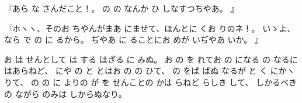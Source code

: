『あら
な
さんだこと！。
の
の
なんか
ひ
しなすつちやあ。
』

『ホヽヽ、そのお
ちやんがまあ
にませて、ほんとに
くお
りのネ！。
いゝよ、
なら
で
の
に
るから。
ぢやあ
に
ることにお
めが
いぢやあ
いか。
』

お
は
せんとして
は
する
はざる
に
みぬ。
お
の
を
れてお
の
になる
の
なるにはあらねど、
にや
の
と
とはお
の
の
ひて、
の
をば
ばぬ
なるが
と
く
にかヽりて、
の
の
に
よりの
が
を
せんことの
かは
らねど
らしき
して、
しかるべき
の
ながら
のみは
しからぬなり。

